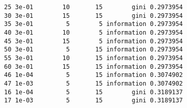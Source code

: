 \begin{verbatim}
25 3e-01        10       15        gini 0.2973954
30 3e-01        15       15        gini 0.2973954
35 3e-01         5        5 information 0.2973954
40 3e-01        10        5 information 0.2973954
45 3e-01        15        5 information 0.2973954
50 3e-01         5       15 information 0.2973954
55 3e-01        10       15 information 0.2973954
60 3e-01        15       15 information 0.2973954
46 1e-04         5       15 information 0.3074902
47 1e-03         5       15 information 0.3074902
16 1e-04         5       15        gini 0.3189137
17 1e-03         5       15        gini 0.3189137
\end{verbatim}

